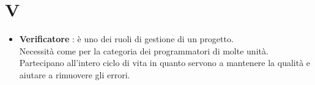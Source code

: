 % 
%
% 
%

\section{V}

\begin{itemize}
	\item \textbf{Verificatore} : è uno dei ruoli di gestione di un progetto. \\
Necessità come per la categoria dei programmatori di molte unità. Partecipano all'intero ciclo di vita in quanto servono a mantenere la qualità e aiutare a rimuovere gli errori.


\end{itemize}